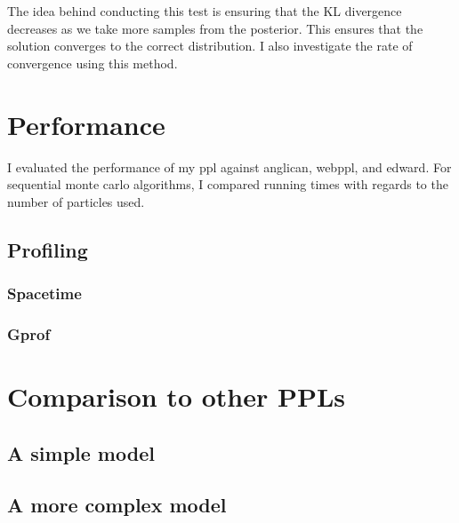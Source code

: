 The idea behind conducting this test is ensuring that the KL divergence decreases as we take more samples from the posterior. This ensures that the solution converges to the correct distribution. I also investigate the rate of convergence using this method.


\section{Performance}
I evaluated the performance of my ppl against anglican, webppl, and edward.
For sequential monte carlo algorithms, I compared running times with regards to the number of particles used.

\subsection{Profiling}
\subsubsection{Spacetime}
\subsubsection{Gprof}

\section{Comparison to other PPLs}

\subsection{A simple model}
\subsection{A more complex model}